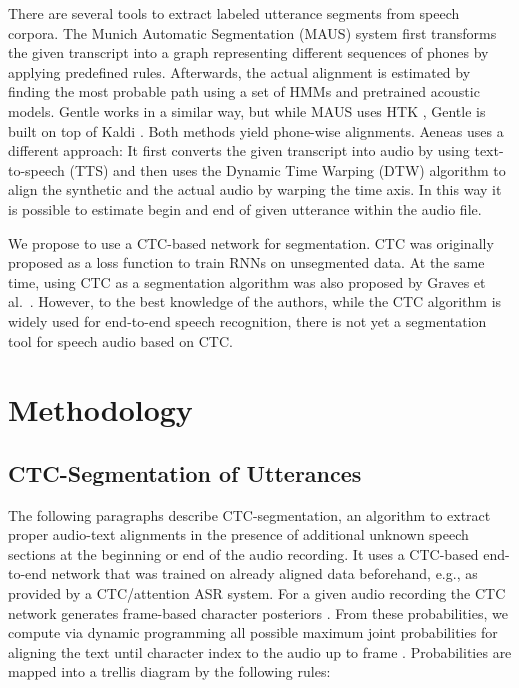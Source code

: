 \documentclass[runningheads]{llncs}
\begin{document}
There are several tools to extract labeled utterance segments from speech corpora.
The Munich Automatic Segmentation (MAUS) system \cite{schiel1999} first transforms the given transcript into a graph representing different sequences of phones by applying predefined rules. 
Afterwards, the actual alignment is estimated by finding the most probable path using a set of HMMs and pretrained acoustic models.
Gentle works in a similar way, but while MAUS uses HTK \cite{young1993htk}, Gentle is built on top of Kaldi \cite{Povey2011}.
Both methods yield phone-wise alignments.
Aeneas \cite{aeneas2017} uses a different approach:
It first converts the given transcript into audio by using text-to-speech (TTS) and then uses the Dynamic Time Warping (DTW) algorithm to align the synthetic and the actual audio by warping the time axis. 
In this way it is possible to estimate begin and end of given utterance within the audio file.

We propose to use a CTC-based network for segmentation.
CTC was originally proposed as a loss function to train RNNs on unsegmented data.
At the same time, using CTC as a segmentation algorithm was also proposed by Graves et al.~\cite{Graves2006}.
However, to the best knowledge of the authors, while the CTC algorithm is widely used for end-to-end speech recognition,
there is not yet a segmentation tool for speech audio based on CTC.




\section{Methodology}

\subsection{CTC-Segmentation of Utterances}
\label{sec:alignment}
The following paragraphs describe CTC-segmentation, an algorithm to extract proper audio-text alignments in the presence of additional unknown speech sections at the beginning or end of the audio recording.
It uses a CTC-based end-to-end network that was trained on already aligned data beforehand, e.g., as provided by a CTC/attention ASR system.
For a given audio recording the CTC network generates frame-based character posteriors .
From these probabilities, we compute via dynamic programming all possible maximum joint probabilities  for aligning the text until character index  to the audio up to frame .
Probabilities are mapped into a trellis diagram by the following rules:
\end{document}
